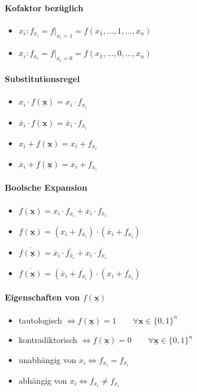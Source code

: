 \documentclass[6pt,a4paper]{scrartcl}
\renewcommand{\vec}[1]{\ensuremath{\underline{\boldsymbol {#1}}}}
\renewcommand{\vec}[1]{\ensuremath{\underline{\boldsymbol {#1}}}}
\begin{document}
\begin{multicols*}{3}
	\paragraph{Kofaktor bezüglich}
	\begin{itemize}\itemsep0pt
	\item $x_i: f_{x_i}=f|_{x_i=1}=f(x_1,\dots,1,\dots,x_n)$
	\item $\overline x_i: f_{\overline x_i}=f|_{x_i=0}=f(x_1,\dots,0,\dots,x_n)$
	\end{itemize}
	\paragraph{Substitutionsregel}
	\begin{itemize}\itemsep0pt
		\item $x_i \cdot f(\vec{x})=x_i \cdot f_{x_{i}}$
		\item $\overline{x}_i \cdot f(\vec{x})=\overline{x}_i \cdot f_{\overline{x}_{i}}$
		\item $x_i + f(\vec{x})=x_i + f_{\overline{x}_{i}}$
		\item $\overline{x}_i + f(\vec{x})=\overline{x}_i + f_{x_{i}}$
	\end{itemize}
	\paragraph{Boolsche Expansion}
	\begin{itemize}\itemsep0pt
		\item $f(\vec{x})=x_i \cdot f_{x_i} + \overline{x}_i \cdot f_{\overline{x}_i}$
		\item $f(\vec{x})=(x_i + f_{\overline{x}_i}) \cdot (\overline{x}_i + f_{x_i})$
		\item $\overline{f(\vec{x})}=\overline{x}_i \cdot \overline{f_{\overline{x}_i}} + x_i \cdot \overline{f_{x_i}}$
		\item $\overline{f(\vec{x})}=(\overline{x}_i + \overline{f_{x_i}}) \cdot (x_i + \overline{f_{\overline{x}_i}})$
	\end{itemize}
	\paragraph{Eigenschaften von $f(\vec{x})$}
	\begin{itemize}\itemsep0pt
		\item tautologisch $\Leftrightarrow f(\vec{x})=1 \qquad \forall \vec x \in \{0,1\}^n$
		\item kontradiktorisch $\Leftrightarrow f(\vec{x})=0 \qquad \forall \vec x \in \{0,1\}^n$
		\item unabhängig von $x_i \Leftrightarrow f_{x_i} = f_{\overline x_i}$
		\item abhängig von $x_i \Leftrightarrow f_{x_i} \ne f_{\overline x_i}$
	\end{itemize}
	

\end{multicols*}
\end{document}
